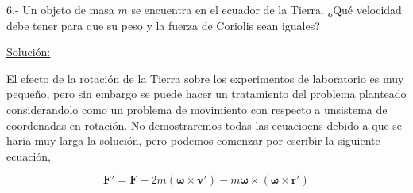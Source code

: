 \documentclass[a4paper,10pt]{article}
\begin{document}
% 
% 
% 







6.- Un objeto de masa $m$ se encuentra en el ecuador de la Tierra. ¿Qué velocidad debe 
tener para que su peso y la fuerza de Coriolis sean iguales?

\vspace{.3cm}

\underline{Solución:}

\vspace{.3cm}

El efecto de la rotación de la Tierra sobre los experimentos de laboratorio es muy pequeño, pero sin embargo se puede
hacer un tratamiento del problema planteado considerandolo como un problema de movimiento con respecto
a unsistema de coordenadas en rotación. No demostraremos todas las ecuacioens debido a que se haría
muy larga la solución, pero podemos comenzar por escribir la siguiente ecuación,

\begin{equation}
 \mathbf{F'} = \mathbf{F} - 2m(\mathbf{\omega} \times \mathbf{v'}) - m\mathbf{\omega} \times (\mathbf{\omega} \times \mathbf{r'})
 \label{eq:FuerzasDeSistemaRotacion}
\end{equation}
\end{document}
